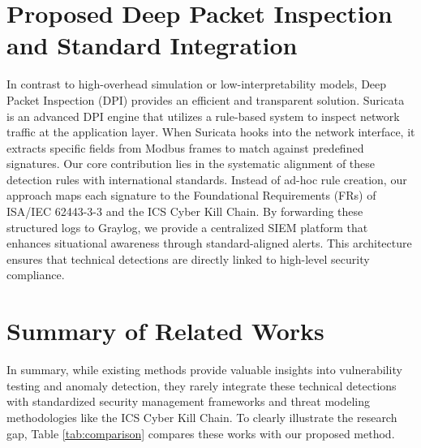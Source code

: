 \section{Proposed Deep Packet Inspection and Standard Integration}
In contrast to high-overhead simulation or low-interpretability models, Deep Packet Inspection (DPI) provides an efficient and transparent solution. Suricata is an advanced DPI engine that utilizes a rule-based system to inspect network traffic at the application layer. When Suricata hooks into the network interface, it extracts specific fields from Modbus frames to match against predefined signatures. 
\noindent
Our core contribution lies in the systematic alignment of these detection rules with international standards. Instead of ad-hoc rule creation, our approach maps each signature to the Foundational Requirements (FRs) of ISA/IEC 62443-3-3 and the ICS Cyber Kill Chain. By forwarding these structured logs to Graylog, we provide a centralized SIEM platform that enhances situational awareness through standard-aligned alerts. This architecture ensures that technical detections are directly linked to high-level security compliance.

\section{Summary of Related Works}
In summary, while existing methods provide valuable insights into vulnerability testing and anomaly detection, they rarely integrate these technical detections with standardized security management frameworks and threat modeling methodologies like the ICS Cyber Kill Chain. To clearly illustrate the research gap, Table \ref{tab:comparison} compares these works with our proposed method.

